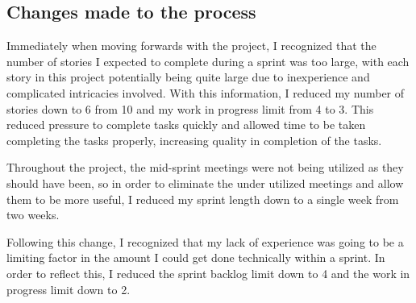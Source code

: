 \subsection{Changes made to the process}

Immediately when moving forwards with the project, I recognized that the number of stories I expected to complete during a sprint was too large, with each story in this project potentially being quite large due to inexperience and complicated intricacies involved. With this information, I reduced my number of stories down to 6 from 10 and my work in progress limit from 4 to 3. This reduced pressure to complete tasks quickly and allowed time to be taken completing the tasks properly, increasing quality in completion of the tasks.

Throughout the project, the mid-sprint meetings were not being utilized as they should have been, so in order to eliminate the under utilized meetings and allow them to be more useful, I reduced my sprint length down to a single week from two weeks.

Following this change, I recognized that my lack of experience was going to be a limiting factor in the amount I could get done technically within a sprint. In order to reflect this, I reduced the sprint backlog limit down to 4 and the work in progress limit down to 2. \\



